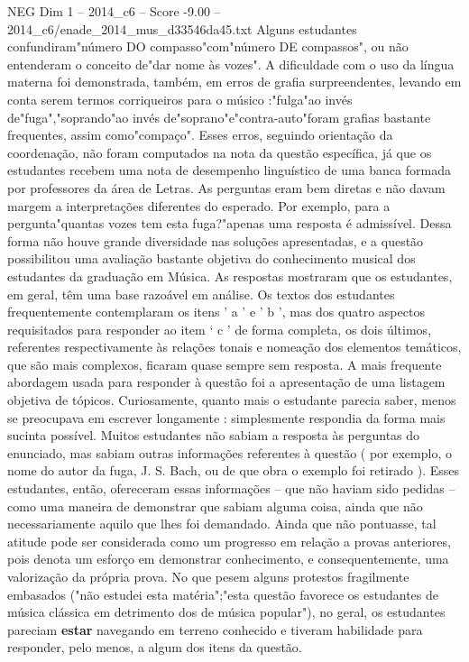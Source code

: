 \begin{textsample}{NEG Dim 1 – 2014\_c6 – Score -9.00 – 2014\_c6/enade\_2014\_mus\_d33546da45.txt}
Alguns estudantes confundiram"número DO compasso"com"número DE compassos", ou não entenderam o conceito de"dar nome às vozes".
A dificuldade com o uso da língua materna foi demonstrada, também, em erros de grafia surpreendentes, levando em conta serem termos corriqueiros para o músico :"fulga"ao invés de"fuga","soprando"ao invés de"soprano"e"contra-auto"foram grafias bastante frequentes, assim como"compaço".
Esses erros, seguindo orientação da coordenação, não foram computados na nota da questão específica, já que os estudantes recebem uma nota de desempenho linguístico de uma banca formada por professores da área de Letras.
As perguntas eram bem diretas e não davam margem a interpretações diferentes do esperado.
Por exemplo, para a pergunta"quantas vozes tem esta fuga?"apenas uma resposta é admissível.
Dessa forma não houve grande diversidade nas soluções apresentadas, e a questão possibilitou uma avaliação bastante objetiva do conhecimento musical dos estudantes da graduação em Música.
As respostas mostraram que os estudantes, em geral, têm uma base razoável em análise.
Os textos dos estudantes frequentemente contemplaram os itens ’ a ' e ' b ', mas dos quatro aspectos requisitados para responder ao item ‘ c ' de forma completa, os dois últimos, referentes respectivamente às relações tonais e nomeação dos elementos temáticos, que são mais complexos, ficaram quase sempre sem resposta.
A mais frequente abordagem usada para responder à questão foi a apresentação de uma listagem objetiva de tópicos.
Curiosamente, quanto mais o estudante parecia saber, menos se preocupava em escrever longamente : simplesmente respondia da forma mais sucinta possível.
Muitos estudantes não sabiam a resposta às perguntas do enunciado, mas sabiam outras informações referentes à questão ( por exemplo, o nome do autor da fuga, J.
S.
Bach, ou de que obra o exemplo foi retirado ).
Esses estudantes, então, ofereceram essas informações – que não haviam sido pedidas – como uma maneira de demonstrar que sabiam alguma coisa, ainda que não necessariamente aquilo que lhes foi demandado.
Ainda que não pontuasse, tal atitude pode ser considerada como um progresso em relação a provas anteriores, pois denota um esforço em demonstrar conhecimento, e consequentemente, uma valorização da própria prova.
No que pesem alguns protestos fragilmente embasados ("não estudei esta matéria";"esta questão favorece os estudantes de música clássica em detrimento dos de música popular"), no geral, os estudantes pareciam \textbf{estar} navegando em terreno conhecido e tiveram habilidade para responder, pelo menos, a algum dos itens da questão.

\end{textsample}
